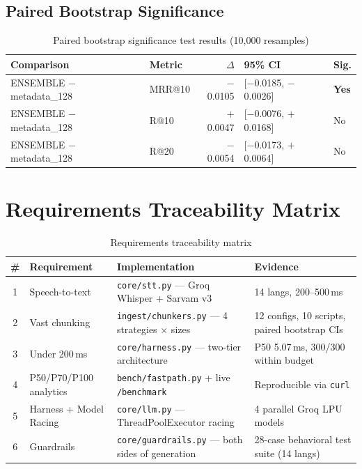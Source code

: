 \documentclass[12pt,a4paper]{article}
\begin{document}
\subsection{Paired Bootstrap Significance}

\begin{table}[H]
\centering
\small
\begin{tabular}{llrll}
\toprule
\textbf{Comparison} & \textbf{Metric} & \textbf{$\Delta$} & \textbf{95\% CI} & \textbf{Sig.} \\
\midrule
ENSEMBLE $-$ metadata\_128 & MRR@10  & $-$0.0105 & [$-$0.0185, $-$0.0026] & \textbf{Yes} \\
ENSEMBLE $-$ metadata\_128 & R@10    & $+$0.0047 & [$-$0.0076, $+$0.0168] & No \\
ENSEMBLE $-$ metadata\_128 & R@20    & $-$0.0054 & [$-$0.0173, $+$0.0064] & No \\
\bottomrule
\end{tabular}
\caption{Paired bootstrap significance test results (10,000 resamples)}
\end{table}


\section{Requirements Traceability Matrix}

\begin{table}[H]
\centering
\small
\begin{tabularx}{\textwidth}{c p{2.5cm} p{3.5cm} X}
\toprule
\textbf{\#} & \textbf{Requirement} & \textbf{Implementation} & \textbf{Evidence} \\
\midrule
1 & Speech-to-text          & \texttt{core/stt.py} --- Groq Whisper + Sarvam v3            & 14 langs, 200--500\,ms \\
2 & Vast chunking           & \texttt{ingest/chunkers.py} --- 4 strategies $\times$ sizes  & 12 configs, 10 scripts, paired bootstrap CIs \\
3 & Under 200\,ms           & \texttt{core/harness.py} --- two-tier architecture            & P50 5.07\,ms, 300/300 within budget \\
4 & P50/P70/P100 analytics  & \texttt{bench/fastpath.py} + live \texttt{/benchmark}         & Reproducible via \texttt{curl} \\
5 & Harness + Model Racing  & \texttt{core/llm.py} --- ThreadPoolExecutor racing            & 4 parallel Groq LPU models \\
6 & Guardrails              & \texttt{core/guardrails.py} --- both sides of generation      & 28-case behavioral test suite (14 langs) \\
\bottomrule
\end{tabularx}
\caption{Requirements traceability matrix}
\end{table}
\end{document}

